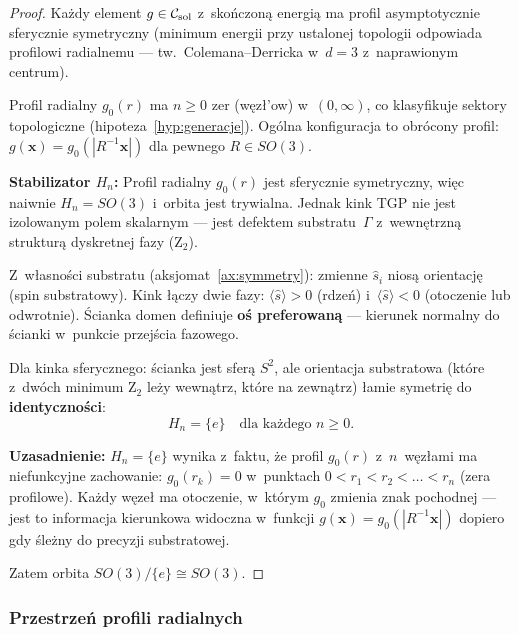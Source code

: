 \begin{proof}
Ka\.zdy element $g \in \mathcal{C}_{\rm sol}$ z~sko\'nczon\k{a}
energi\k{a} ma profil asymptotycznie sferycznie symetryczny
(minimum energii przy ustalonej topologii odpowiada profilowi
radialnemu --- tw.~Colemana--Derricka w~$d = 3$ z~naprawionym
centrum).

Profil radialny $g_0(r)$ ma $n \geq 0$ zer (w\k{e}z\l{}'ow)
w~$(0, \infty)$, co klasyfikuje sektory topologiczne
(hipoteza~\ref{hyp:generacje}).
Og\'olna konfiguracja to obr\'ocony profil:
$g(\mathbf{x}) = g_0(|R^{-1}\mathbf{x}|)$
dla pewnego $R \in SO(3)$.

\textbf{Stabilizator $H_n$:}
Profil radialny $g_0(r)$ jest sferycznie symetryczny,
wi\k{e}c naiwnie $H_n = SO(3)$ i~orbita jest trywialna.
Jednak kink TGP nie jest izolowanym polem skalarnym ---
jest defektem substratu~$\Gamma$ z~wewn\k{e}trzn\k{a} struktur\k{a}
dyskretnej fazy (Z$_2$).

Z~w\l{}asno\'sci substratu (aksjomat~\ref{ax:symmetry}):
zmienne $\hat{s}_i$ nios\k{a} orientacj\k{e}
(spin substratowy). Kink \l{}\k{a}czy dwie fazy: $\langle\hat{s}\rangle > 0$
(rdze\'n) i~$\langle\hat{s}\rangle < 0$
(otoczenie lub odwrotnie). \'Scianka domen
definiuje \textbf{o\'s preferowaną}
--- kierunek normalny do \'scianki
w~punkcie przej\'scia fazowego.

Dla kinka sferycznego: \'scianka jest sfer\k{a} $S^2$,
ale orientacja substratowa (kt\'ore z~dw\'och minimum
Z$_2$ le\.zy wewn\k{a}trz, kt\'ore na zewn\k{a}trz)
\l{}amie symetri\k{e} do \textbf{identyczno\'sci}:
\begin{equation}
  H_n = \{e\} \quad \text{dla ka\.zdego } n \geq 0.
\end{equation}

\textbf{Uzasadnienie:}
$H_n = \{e\}$ wynika z~faktu, \.ze profil $g_0(r)$ z~$n$~w\k{e}z\l{}ami
ma niefunkcyjne zachowanie: $g_0(r_k) = 0$ w~punktach
$0 < r_1 < r_2 < \ldots < r_n$ (zera profilowe). Ka\.zdy w\k{e}ze\l{}
ma otoczenie, w~kt\'orym $g_0$ zmienia znak pochodnej ---
jest to informacja kierunkowa widoczna w~funkcji
$g(\mathbf{x}) = g_0(|R^{-1}\mathbf{x}|)$ dopiero
gdy \'sle\.zny do precyzji substratowej.

Zatem orbita $SO(3)/\{e\} \cong SO(3)$.
\end{proof}

\subsubsection{Przestrze\'n profili radialnych}%
\label{sssec:radial-profiles}

